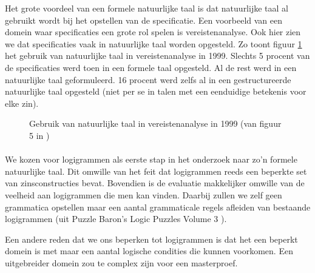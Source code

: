 
Het grote voordeel van een formele natuurlijke taal is dat natuurlijke taal al gebruikt wordt bij het opstellen van de specificatie. Een voorbeeld van een domein waar specificaties een grote rol spelen is vereistenanalyse. Ook hier zien we dat specificaties vaak in natuurlijke taal worden opgesteld. Zo toont figuur \ref{fig:natural-language-use} het gebruik van natuurlijke taal in vereistenanalyse in 1999. Slechts 5 procent van de specificaties werd toen in een formele taal opgesteld. Al de rest werd in een natuurlijke taal geformuleerd. 16 procent werd zelfs al in een gestructureerde natuurlijke taal opgesteld (niet per se in talen met een eenduidige betekenis voor elke zin).

\begin{figure}
  \caption[Gebruik van natuurlijke taal in vereistenanalyse]{Gebruik van natuurlijke taal in vereistenanalyse in 1999 (van figuur 5 in \cite{Luisa2004})}
  \label{fig:natural-language-use}
\end{figure}

\paragraph{} We kozen voor logigrammen als eerste stap in het onderzoek naar zo'n formele natuurlijke taal. Dit omwille van het feit dat logigrammen reeds een beperkte set van zinsconstructies bevat. Bovendien is de evaluatie makkelijker omwille van de veelheid aan logigrammen die men kan vinden. Daarbij zullen we zelf geen grammatica opstellen maar een aantal grammaticale regels afleiden van bestaande logigrammen (uit Puzzle Baron's Logic Puzzles Volume 3 \cite{logigrammen}).

Een andere reden dat we ons beperken tot logigrammen is dat het een beperkt domein is met maar een aantal logische condities die kunnen voorkomen. Een uitgebreider domein zou te complex zijn voor een masterproef.
